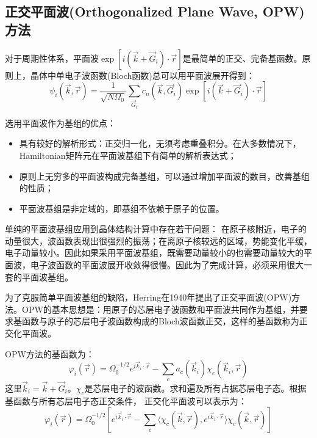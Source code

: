 \subsection{正交平面波(Orthogonalized Plane Wave, OPW)方法}
对于周期性体系，平面波$\exp[i(\vec k+\vec G_i)\cdot\vec r]$是最简单的正交、完备基函数。原则上，晶体中单电子波函数(Bloch函数)总可以用平面波展开得到：
\begin{equation}
  \psi_i(\vec k,\vec r)=\frac1{\sqrt{N\Omega_0}}\sum_{\vec G_i}c_n(\vec k,\vec G_i)\exp[i(\vec k+\vec G_i)\cdot\vec r]
  \label{eq:solid-84}
\end{equation}

选用平面波作为基组的优点：
\begin{itemize}
	\item 具有较好的解析形式：正交归一化，无须考虑重叠积分。在大多数情况下， Hamiltonian矩阵元在平面波基组下有简单的解析表达式；
	\item 原则上无穷多的平面波构成完备基组，可以通过增加平面波的数目，改善基组的性质；
	\item 平面波基组是非定域的，即基组不依赖于原子的位置。
\end{itemize}

单纯的平面波基组应用到晶体结构计算中存在若干问题：%
在原子核附近，电子的动量很大，波函数表现出很强烈的振荡；在离原子核较远的区域，势能变化平缓，电子动量较小。因此如果采用平面波基组，既需要动量较小的也需要动量较大的平面波，电子波函数的平面波展开收敛得很慢。因此为了完成计算，必须采用很大一套的平面波基组。

为了克服简单平面波基组的缺陷，Herring在1940年提出了正交平面波(OPW)方法\cite{PR57-1169_1940}。OPW的基本思想是：用原子的芯层电子波函数和平面波共同作为基组，并要求基函数与原子的芯层电子波函数构成的Bloch波函数正交，这样的基函数称为正交化平面波。

OPW方法的基函数为：
\begin{equation}
  \varphi_i(\vec r)=\Omega_0^{-1/2}e^{i\vec k_i\cdot\vec r}-\sum_ca_c(\vec k_i)\chi_c(\vec k_i,\vec r)
  \label{eq:OPW-set}
\end{equation}
这里$\vec k_i=\vec k+\vec G_i$。$\chi_c$是芯层电子的波函数。求和遍及所有占据芯层电子态。根据基函数与所有芯层电子态正交条件，
正交化平面波可以表示为：
\begin{equation}
  \varphi_i(\vec r)=\Omega_0^{-1/2}\left[e^{i\vec k_i\cdot\vec r}-\sum_c\langle\chi_c(\vec k,\vec r),e^{i\vec k_i\cdot\vec r}\rangle\chi_c(\vec k,\vec r)\right]
  \label{eq:solid-85}
\end{equation}

